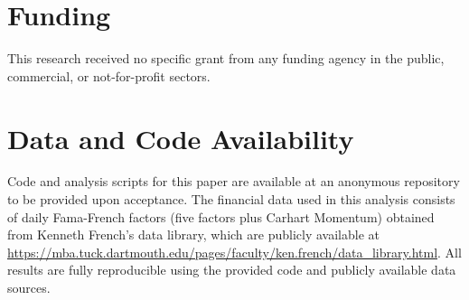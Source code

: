 \documentclass[sigconf,anonymous]{acmart}
\begin{document}
\section*{Funding}

This research received no specific grant from any funding agency in the public,
commercial, or not-for-profit sectors.

\section*{Data and Code Availability}

Code and analysis scripts for this paper are available at an anonymous repository to be provided upon acceptance. The financial data used in this analysis consists of daily Fama-French factors (five factors plus Carhart Momentum) obtained from Kenneth French's data library, which are publicly available at \url{https://mba.tuck.dartmouth.edu/pages/faculty/ken.french/data_library.html}. All results are fully reproducible using the provided code and publicly available data sources.


\end{document}

